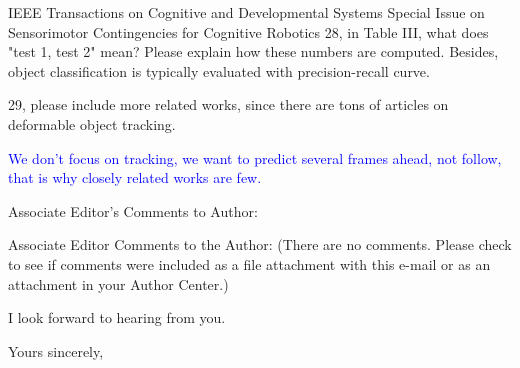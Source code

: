 \documentclass[a4paper,12pt]{letter}
\newcommand{\comment}[1]{\textcolor{blue}{#1}}
\begin{document}
\begin{letter}{IEEE Transactions on Cognitive and Developmental Systems\newline
Special Issue on Sensorimotor Contingencies for Cognitive Robotics}
28, in Table III, what does "test 1, test 2" mean? Please explain how these numbers are computed. Besides, object classification is typically evaluated with precision-recall curve. 

29, please include more related works, since there are tons of articles on deformable object tracking.

\comment{We don't focus on tracking, we want to predict several frames ahead, not follow, that is why closely related works are few.}

Associate Editor's Comments to Author: 

Associate Editor 
Comments to the Author: 
(There are no comments. Please check to see if comments were included as a file attachment with this e-mail or as an attachment in your Author Center.)


I look forward to hearing from you.


\signature{Dra. Verónica Esther Arriola Ríos\\
Profesora Asociada C de T.C.\newline
Departamento de Matemáticas, Cub 119.\newline
Facultad de Ciencias, UNAM \newline
v.arriola@ciencias.unam.mx \newline
+(52)55 5622 5426}

\closing{Yours sincerely,}


\end{letter}
\end{document}
